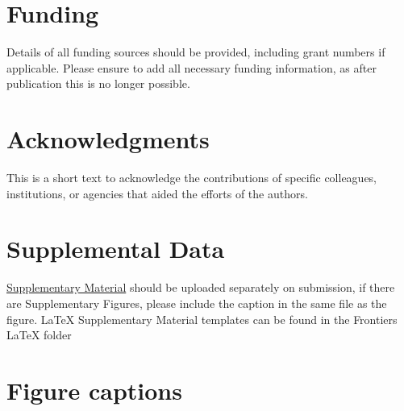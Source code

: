 \documentclass[utf8]{frontiersSCNS} %
\begin{document}
\section*{Funding}
Details of all funding sources should be provided, including grant numbers if applicable. Please ensure to add all necessary funding information, as after publication this is no longer possible.

\section*{Acknowledgments}
This is a short text to acknowledge the contributions of specific colleagues, institutions, or agencies that aided the efforts of the authors.

\section*{Supplemental Data}
 \href{http://home.frontiersin.org/about/author-guidelines#SupplementaryMaterial}{Supplementary Material} should be uploaded separately on submission, if there are Supplementary Figures, please include the caption in the same file as the figure. LaTeX Supplementary Material templates can be found in the Frontiers LaTeX folder 





\section*{Figure captions}

\end{document}
